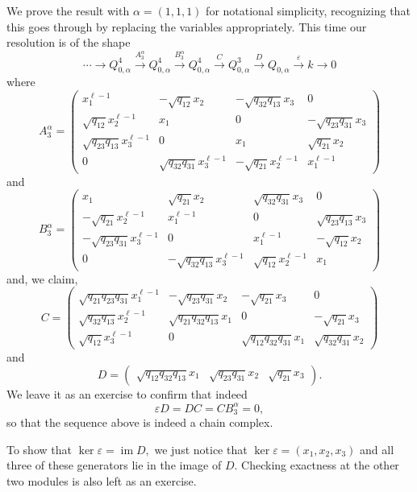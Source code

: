 \documentclass [11pt, proquest] {uwthesis}[2020/02/24]
\begin{document}
    \begin{prf}
        We prove the result with $\alpha=(1,1,1)$ for notational simplicity, recognizing that this goes through by replacing the variables appropriately. This time our resolution is of the shape
        \[\cdots\to Q_{0,\alpha}^4\xrightarrow{A_3^\alpha}Q_{0,\alpha}^4\xrightarrow{B_3^\alpha} Q_{0,\alpha}^4\xrightarrow{C}Q_{0,\alpha}^3\xrightarrow{D} Q_{0,\alpha}\xrightarrow{\varepsilon}k\to 0\]
        where
         \[A_3^\alpha=\begin{pmatrix}
        x_1^{\ell-1} & -\sqrt{q_{12}}x_2 & -\sqrt{q_{32}q_{13}}x_3 & 0\\ 
        \sqrt{q_{12}}x_2^{\ell-1} & x_1 & 0 & -\sqrt{q_{23}q_{31}}x_3\\
        \sqrt{q_{23}q_{13}}x_3^{\ell-1} & 0 & x_1 & \sqrt{q_{21}}x_2\\ 
        0 & \sqrt{q_{32}q_{31}}x_3^{\ell-1} &-\sqrt{q_{21}}x_2^{\ell-1} & x_1^{\ell-1}
    \end{pmatrix}\]
    and
    \[B_3^\alpha=\begin{pmatrix}
        x_1 & \sqrt{q_{21}}x_2 & \sqrt{q_{32}q_{31}}x_3 & 0\\ 
        -\sqrt{q_{21}}x_2^{\ell-1} & x_1^{\ell-1} & 0 & \sqrt{q_{23}q_{13}}x_3\\
        -\sqrt{q_{23}q_{31}}x_3^{\ell-1} & 0 & x_1^{\ell-1} & -\sqrt{q_{12}}x_2\\ 
        0 & -\sqrt{q_{32}q_{13}}x_3^{\ell-1} & \sqrt{q_{12}}x_2^{\ell-1} & x_1
    \end{pmatrix}\]
    and, we claim,
    \[C=\begin{pmatrix}
        \sqrt{q_{21}q_{23}q_{31}}x_1^{\ell-1} & -\sqrt{q_{23}q_{31}}x_2 & -\sqrt{q_{21}}x_3 & 0\\
        \sqrt{q_{32}q_{13}}x_2^{\ell-1} & \sqrt{q_{21}q_{32}q_{13}}x_1 & 0 & -\sqrt{q_{21}}x_3\\
        \sqrt{q_{12}}x_3^{\ell-1} & 0 &\sqrt{q_{12}q_{32}q_{31}}x_1 & \sqrt{q_{32}q_{31}}x_2
    \end{pmatrix}\]
    and
    \[D=\begin{pmatrix}
        \sqrt{q_{12}q_{32}q_{13}}x_1 & \sqrt{q_{23}q_{31}}x_2 & \sqrt{q_{21}}x_3
    \end{pmatrix}.\]
    We leave it as an exercise to confirm that indeed
    \[\varepsilon D=DC=CB_3^\alpha=0,\]
    so that the sequence above is indeed a chain complex.
    
    To show that $\ker\varepsilon=\operatorname{im}D,$ we just notice that $\ker\varepsilon=(x_1,x_2,x_3)$ and all three of these generators lie in the image of $D$. Checking exactness at the other two modules is also left as an exercise.
    \end{prf}
\end{document}
